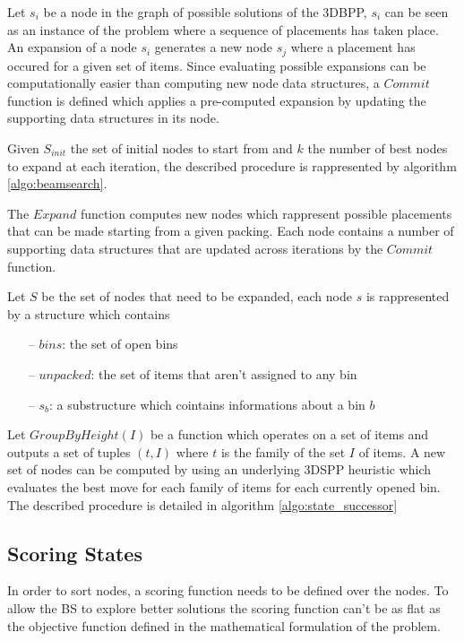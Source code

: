 Let $s_i$ be a node in the graph of possible solutions of the 3DBPP, %
$s_i$ can be seen as an instance of the problem where a sequence of placements has taken place.
An expansion of a node $s_i$ generates a new node $s_j$ where a placement has occured for a given set of items.
Since evaluating possible expansions can be computationally easier than computing new node data structures, %
a $Commit$ function is defined which applies a pre-computed expansion by updating the supporting data structures in its node.

Given $S_{init}$ the set of initial nodes to start from and $k$ the number of best nodes to expand at each iteration, the described procedure is rappresented by algorithm \ref{algo:beamsearch}.



The $Expand$ function computes new nodes which rappresent possible placements that can be made starting from a given packing.
Each node contains a number of supporting data structures that are updated across iterations by the $Commit$ function.

Let $S$ be the set of nodes that need to be expanded, each node $s$ is rappresented by a structure which contains
\begin{itemize}
    \item[--] $bins$: the set of open bins
    \item[--] $unpacked$: the set of items that aren't assigned to any bin
    \item[--] $s_b$: a substructure which cointains informations about a bin $b$
\end{itemize}
Let $GroupByHeight(I)$ be a function which operates on a set of items and outputs a set of tuples $(t, I)$ where $t$ is the family of the set $I$ of items. %
A new set of nodes can be computed by using an underlying 3DSPP heuristic which evaluates the best move for each family of items for each currently opened bin.
The described procedure is detailed in algorithm \ref{algo:state_successor}  



\subsection{Scoring States}
\label{ssec:scoring_states}%
In order to sort nodes, a scoring function needs to be defined over the nodes. 
To allow the BS to explore better solutions the scoring function can't be as flat as the objective function defined in the mathematical formulation of the problem. %

